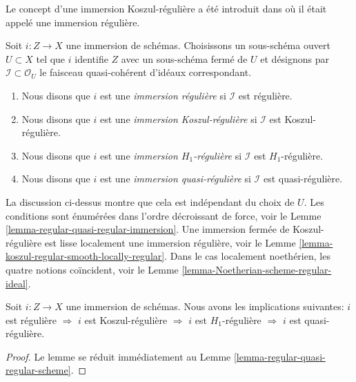 \begin{definition}
\label{definition-regular-immersion}
\begin{reference}
Le concept d'une immersion Koszul-régulière a été introduit dans  \cite[Expose VII, Definition 1.4]{SGA6}  où
il était appelé une immersion régulière.
\end{reference}
Soit  $i : Z \to X$  une immersion de schémas. Choisissons un sous-schéma ouvert
 $U \subset X$  tel que  $i$  identifie  $Z$  avec un sous-schéma fermé
de  $U$  et désignons par  $\mathcal{I} \subset \mathcal{O}_U$  le faisceau quasi-cohérent d'idéaux
correspondant.
\begin{enumerate}
\item Nous disons que  $i$  est une  {\it  immersion
régulière}  si  $\mathcal{I}$  est régulière.
\item Nous disons que  $i$  est une  {\it  immersion
Koszul-régulière}  si  $\mathcal{I}$  est Koszul-régulière.
\item Nous disons que  $i$  est une  {\it  immersion
 $H_1$-régulière}  si  $\mathcal{I}$  est  $H_1$-régulière.
\item Nous disons que  $i$  est une  {\it  immersion
quasi-régulière}  si  $\mathcal{I}$  est quasi-régulière.
\end{enumerate}
\end{definition}

\noindent
La discussion ci-dessus montre que cela est indépendant du choix de  $U$.
Les conditions sont énumérées dans l'ordre décroissant de force, voir le Lemme
 \ref{lemma-regular-quasi-regular-immersion}. Une immersion fermée de Koszul-régulière est lisse localement une
immersion régulière, voir le Lemme  \ref{lemma-koszul-regular-smooth-locally-regular}. Dans le cas localement
noethérien, les quatre notions coïncident, voir le Lemme  \ref{lemma-Noetherian-scheme-regular-ideal}.

\begin{lemma}
\label{lemma-regular-quasi-regular-immersion}
Soit  $i : Z \to X$  une immersion de schémas. Nous avons les implications suivantes:
 $i$  est régulière  $\Rightarrow$   $i$  est Koszul-régulière
 $\Rightarrow$   $i$  est  $H_1$-régulière  $\Rightarrow$   $i$  est
quasi-régulière.
\end{lemma}

\begin{proof}
Le lemme se réduit immédiatement au Lemme  \ref{lemma-regular-quasi-regular-scheme}.
\end{proof}

